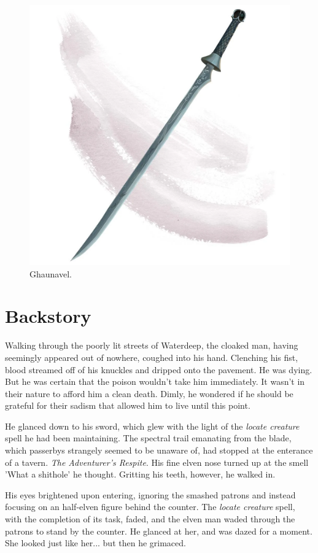 \documentclass[12pt]{article}
\begin{document}
\begin{figure}[H]
  \centering
  \includegraphics[width=.62\textwidth]{./resources/Ghaunavel}
  \caption{Ghaunavel.}
\end{figure}

\section{Backstory}

Walking through the poorly lit streets of Waterdeep, the cloaked man, having
seemingly appeared out of nowhere, coughed into his hand. Clenching his fist,
blood streamed off of his knuckles and dripped onto the pavement. He was dying.
But he was certain that the poison wouldn't take him immediately. It wasn't in
their nature to afford him a clean death. Dimly, he wondered if he should be
grateful for their sadism that allowed him to live until this point.

He glanced down to his sword, which glew with the light of the {\em locate
creature} spell he had been maintaining. The spectral trail emanating from the
blade, which passerbys strangely seemed to be unaware of, had stopped at the
enterance of a tavern. {\em The Adventurer's Respite}. His fine elven nose
turned up at the smell 'What a shithole' he thought. Gritting his teeth,
however, he walked in.

His eyes brightened upon entering, ignoring the smashed patrons and instead focusing
on an half-elven figure behind the counter. The {\em locate creature} spell,
with the completion of its task, faded, and the elven man waded through the
patrons to stand by the counter. He glanced at her, and was dazed for a moment.
She looked just like her... but then he grimaced.
\end{document}
